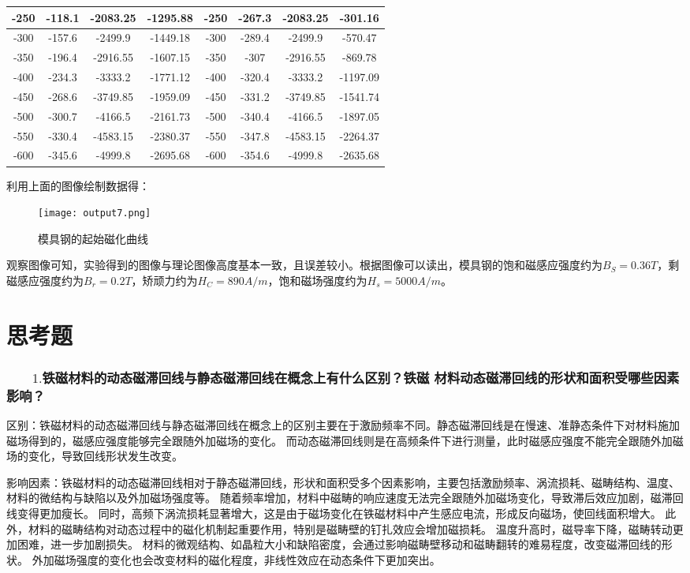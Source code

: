 \documentclass[UTF-8,twoside,cs4size]{ctexart}
\begin{document}
\begin{table}[htbp]
\begin{tabular}{|c|c|c|c|c|c|c|c|}
    -250 & -118.1 & -2083.25& -1295.88 & -250 & -267.3 & -2083.25& -301.16  \\ \hline
    -300 & -157.6 & -2499.9 & -1449.18 & -300 & -289.4 & -2499.9 & -570.47  \\ \hline
    -350 & -196.4 & -2916.55& -1607.15 & -350 & -307   & -2916.55& -869.78  \\ \hline
    -400 & -234.3 & -3333.2 & -1771.12 & -400 & -320.4 & -3333.2 & -1197.09 \\ \hline
    -450 & -268.6 & -3749.85& -1959.09 & -450 & -331.2 & -3749.85& -1541.74 \\ \hline
    -500 & -300.7 & -4166.5 & -2161.73 & -500 & -340.4 & -4166.5 & -1897.05 \\ \hline
    -550 & -330.4 & -4583.15& -2380.37 & -550 & -347.8 & -4583.15& -2264.37 \\ \hline
    -600 & -345.6 & -4999.8 & -2695.68 & -600 & -354.6 & -4999.8 & -2635.68 \\ \hline
    \end{tabular}
\end{table}
利用上面的图像绘制数据得：
\begin{figure}[!h]
    \centering
    \texttt{[image: output7.png]}
    \caption{模具钢的起始磁化曲线}
\end{figure}
\newpage
观察图像可知，实验得到的图像与理论图像高度基本一致，且误差较小。根据图像可以读出，模具钢的饱和磁感应强度约为$B_S=0.36T$，剩磁感应强度约为$B_r=0.2T$，矫顽力约为$H_C=890A/m$，饱和磁场强度约为$H_s=5000A/m$。

\section{思考题}
\subsubsection*{$\qquad1.$铁磁材料的动态磁滞回线与静态磁滞回线在概念上有什么区别？铁磁
    材料动态磁滞回线的形状和面积受哪些因素影响？}
    区别：铁磁材料的动态磁滞回线与静态磁滞回线在概念上的区别主要在于激励频率不同。静态磁滞回线是在慢速、准静态条件下对材料施加磁场得到的，磁感应强度能够完全跟随外加磁场的变化。
    而动态磁滞回线则是在高频条件下进行测量，此时磁感应强度不能完全跟随外加磁场的变化，导致回线形状发生改变。
    
    影响因素：铁磁材料的动态磁滞回线相对于静态磁滞回线，形状和面积受多个因素影响，主要包括激励频率、涡流损耗、磁畴结构、温度、材料的微结构与缺陷以及外加磁场强度等。
    随着频率增加，材料中磁畴的响应速度无法完全跟随外加磁场变化，导致滞后效应加剧，磁滞回线变得更加瘦长。
    同时，高频下涡流损耗显著增大，这是由于磁场变化在铁磁材料中产生感应电流，形成反向磁场，使回线面积增大。
    此外，材料的磁畴结构对动态过程中的磁化机制起重要作用，特别是磁畴壁的钉扎效应会增加磁损耗。
    温度升高时，磁导率下降，磁畴转动更加困难，进一步加剧损失。
    材料的微观结构、如晶粒大小和缺陷密度，会通过影响磁畴壁移动和磁畴翻转的难易程度，改变磁滞回线的形状。
    外加磁场强度的变化也会改变材料的磁化程度，非线性效应在动态条件下更加突出。
    \\
\end{document}
